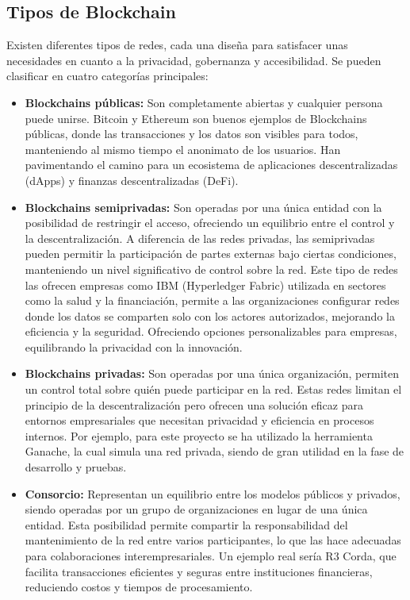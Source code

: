 \subsection{Tipos de Blockchain}

Existen diferentes tipos de redes, cada una diseña para satisfacer unas necesidades en cuanto a la privacidad, gobernanza y accesibilidad. 
Se pueden clasificar en cuatro categorías principales:

\begin{itemize}
\item \textbf{Blockchains públicas:} Son completamente abiertas y cualquier persona puede unirse. Bitcoin y Ethereum son buenos ejemplos de Blockchains públicas, donde las transacciones y los datos son visibles para todos, manteniendo al mismo tiempo el anonimato de los usuarios. Han pavimentando el camino para un ecosistema de aplicaciones descentralizadas (dApps) y finanzas descentralizadas (DeFi).

\item \textbf{Blockchains semiprivadas:} Son operadas por una única entidad con la posibilidad de restringir el acceso, ofreciendo un equilibrio entre el control y la descentralización. A diferencia de las redes privadas, las semiprivadas pueden permitir la participación de partes externas bajo ciertas condiciones, manteniendo un nivel significativo de control sobre la red.
Este tipo de redes las ofrecen empresas como IBM (Hyperledger Fabric) utilizada en sectores como la salud y la financiación, permite a las organizaciones configurar redes donde los datos se comparten solo con los actores autorizados, mejorando la eficiencia y la seguridad. Ofreciendo opciones personalizables para empresas, equilibrando la privacidad con la innovación.

\item \textbf{Blockchains privadas:} Son operadas por una única organización, permiten un control total sobre quién puede participar en la red. Estas redes limitan el principio de la descentralización pero ofrecen una solución eficaz para entornos empresariales que necesitan privacidad y eficiencia en procesos internos.
Por ejemplo, para este proyecto se ha utilizado la herramienta Ganache, la cual simula una red privada, siendo de gran utilidad en la fase de desarrollo y pruebas.

\item \textbf{Consorcio:} Representan un equilibrio entre los modelos públicos y privados, siendo operadas por un grupo de organizaciones en lugar de una única entidad. Esta posibilidad permite compartir la responsabilidad del mantenimiento de la red entre varios participantes, lo que las hace adecuadas para colaboraciones interempresariales. 
Un ejemplo real sería R3 Corda, que facilita transacciones eficientes y seguras entre instituciones financieras, reduciendo costos y tiempos de procesamiento.

\end{itemize} 



